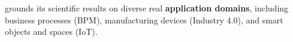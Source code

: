 \project grounds its scientific results on diverse real  \textbf{application domains}, including business processes (BPM), manufacturing devices (Industry 4.0), and smart objects and spaces (IoT).%

 


